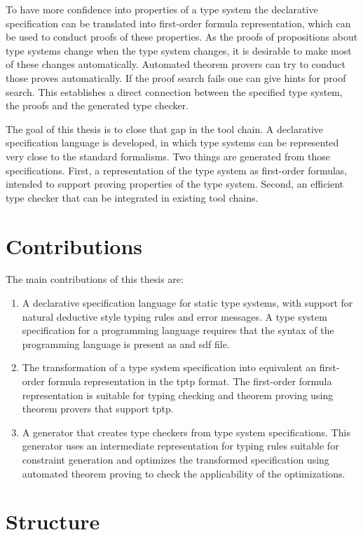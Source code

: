 To have more confidence into properties of a type system the
declarative specification can be translated into first-order formula
representation, which can be used to conduct proofs of these
properties. As the proofs of propositions about type systems change
when the type system changes, it is desirable to make most of these
changes automatically. Automated theorem provers can try to conduct
those proves automatically. If the proof search fails one can give
hints for proof search. This establishes a direct connection between
the specified type system, the proofs and the generated type checker.

The goal of this thesis is to close that gap in the tool chain. A
declarative specification language is developed, in which type systems
can be represented very close to the standard formalisms. Two things
are generated from those specifications. First, a representation of
the type system as first-order formulas, intended to support proving
properties of the type system. Second, an efficient type checker that
can be integrated in existing tool chains.
\section{Contributions}
The main contributions of this thesis are:
\begin{enumerate}
\item A declarative specification language for static type systems,
  with support for natural deductive style typing rules and error
  messages. A type system specification for a programming language
  requires that the syntax of the programming language is present as
  and \gls{sdf} file.
\item The transformation of a type system specification into
  equivalent an first-order formula representation in the \gls{tptp}
  format. The first-order formula representation is suitable for
  typing checking and theorem proving using theorem provers that
  support \gls{tptp}.
\item A generator that creates type checkers from type system
  specifications. This generator uses an intermediate representation
  for typing rules suitable for constraint generation and optimizes
  the transformed specification using automated theorem proving to
  check the applicability of the optimizations.
\end{enumerate}

\section{Structure}

